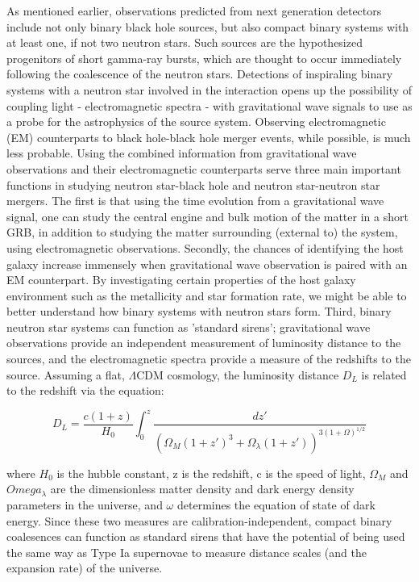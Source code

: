 \documentclass{article}
\begin{document}
As mentioned earlier, observations predicted from next generation detectors include not only binary black hole sources, but also compact binary systems with at least one, if not two neutron stars.  Such sources are the hypothesized progenitors of short gamma-ray bursts, which are thought to occur immediately following the coalescence of the neutron stars.  Detections of inspiraling binary systems with a neutron star involved in the interaction opens up the possibility of coupling light - electromagnetic spectra - with gravitational wave signals to use as a probe for the astrophysics of the source system.  Observing electromagnetic (EM) counterparts to black hole-black hole merger events, while possible, is much less probable.  Using the combined information from gravitational wave observations and their electromagnetic counterparts serve three main important functions in studying neutron star-black hole and neutron star-neutron star mergers.  The first is that using the time evolution from a gravitational wave signal, one can study the central engine and bulk motion of the matter in a short GRB, in addition to studying the matter surrounding (external to) the system, using electromagnetic observations.  Secondly, the chances of identifying the host galaxy increase immensely when gravitational wave observation is paired with an EM counterpart.  By investigating certain properties of the host galaxy environment such as the metallicity and star formation rate, we might be able to better understand how binary systems with neutron stars form.  Third, binary neutron star systems can function as 'standard sirens'; gravitational wave observations provide an independent measurement of luminosity distance to the sources, and the electromagnetic spectra provide a measure of the redshifts to the source.  Assuming a flat, $\Lambda$CDM cosmology, the luminosity distance $D_L$ is related to the redshift via the equation:

\begin{equation} D_L = \frac{c(1+z)}{H_0}\int_{0}^{z} \frac{dz'}{(\Omega_M(1+z')^3 + \Omega_{\lambda}(1+z'))^{3(1+\Omega)^{1/2}}} \end{equation}

where $H_0$ is the hubble constant, z is the redshift, c is the speed of light, $\Omega_M$ and $Omega_{\lambda}$ are the dimensionless matter density and dark energy density parameters in the universe, and $\omega$ determines the equation of state of dark energy.  Since these two measures are calibration-independent, compact binary coalesences can function as standard sirens that have the potential of being used the same way as Type Ia supernovae to measure distance scales (and the expansion rate) of the universe.  
\end{document}
